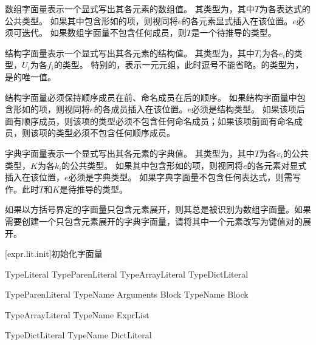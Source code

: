 \pnum
数组字面量\tcode{[$e_1$, $\ldots$, $e_n$]}表示一个显式写出其各元素的数组值。
其类型为，其中$T$为各表达式的公共类型。
如果其中包含形如的项，则视同将$e$的各元素显式插入在该位置。$e$必须可迭代。
如果数组字面量不包含任何成员，则$T$是一个待推导的类型。

\pnum
结构字面量表示一个显式写出其各元素的结构值。
其类型为，其中$T_i$为各$e_i$的类型，$U_i$为各$f_i$的类型。
特别的，表示一元元组，此时逗号不能省略。\tcode{()}的类型为，是的唯一值。

\pnum
结构字面量必须保持顺序成员在前、命名成员在后的顺序。
如果结构字面量中包含形如的项，则视同将$e$的各成员插入在该位置。$e$必须是结构类型。
如果该项后面有顺序成员，则该项的类型必须不包含任何命名成员；如果该项前面有命名成员，则该项的类型必须不包含任何顺序成员。

\pnum
字典字面量\tcode{[$k_1$:$v_1$, $k_2$:$v_2$, $\ldots$, $k_n$:$v_n$]}表示一个显式写出其各元素的字典值。
其类型为，其中$T$为各$v_i$的公共类型，$K$为各$k_i$的公共类型。
如果其中包含形如的项，则视同将$e$的各元素对显式插入在该位置，$e$必须是字典类型。
如果字典字面量不包含任何表达式，则需写作\tcode{[:]}。此时$T$和$K$是待推导的类型。

\pnum
如果以方括号界定的字面量只包含元素展开，则其总是被识别为数组字面量。\enternote 如果需要创建一个只包含元素展开的字典字面量，请将其中一个元素改写为键值对的展开。\exitnote

[expr.lit.init]{初始化字面量}

\begin{bnf}{TypeLiteral}
    TypeParenLiteral \br
    TypeArrayLiteral \br
    TypeDictLiteral
\end{bnf}

\begin{bnf}{TypeParenLiteral}
    TypeName \terminal{(} Arguments\bnfq \terminal{)} Block\bnfq \br
    TypeName Block
\end{bnf}

\begin{bnf}{TypeArrayLiteral}
    TypeName \terminal{[} ExprList\bnfq \terminal{]}
\end{bnf}

\begin{bnf}{TypeDictLiteral}
    TypeName DictLiteral
\end{bnf}

